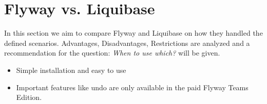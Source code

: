 

\chapter{Flyway vs. Liquibase}
%
In this section we aim to compare Flyway and Liquibase on how they handled the defined scenarios.
Advantages, Disadvantages, Restrictions are analyzed and a recommendation for the question: \textit{When to use which?} will be given.

%

\begin{itemize}
	\item Simple installation and easy to use
\end{itemize}

%
\begin{itemize}
	\item Important features like undo are only available in the paid Flyway Teams Edition.
\end{itemize}


\newpage